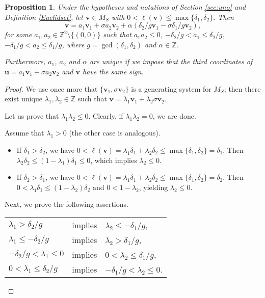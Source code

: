 \documentclass[11pt]{amsart}
\newtheorem{proposition}[theorem]{Proposition}
\theoremstyle{remark}
\begin{document}
\begin{proposition}\label{normalizacion} 
Under the hypotheses and notations of Section \ref{sec:uno} and Definition \ref{Euclidset}, let $\mathbf v\in M_S$ with $0< \ell(\mathbf v) \le \max\{\delta_1,\delta_2\}$. Then
\[
\mathbf v=a_1\mathbf v_1+\sigma a_2\mathbf v_2+\alpha(\delta_2/g\mathbf v_1-\sigma\delta_1/g\mathbf v_2),
\]
for some $a_1,a_2\in \mathbb Z^2\setminus\{(0,0)\}$ such that $a_1a_2\le 0$, $-\delta_2/g<a_1\le 
\delta_2/g$, $-\delta_1/g<a_2\le \delta_1/g$, where $g=\gcd(\delta_1,\delta_2)$ and $\alpha\in\mathbb Z$.

Furthermore, $a_1$, $a_2$ and $\alpha$ are unique if we impose that the third coordinates of $\mathbf u=a_1\mathbf v_1+\sigma a_2\mathbf v_2$ and $\mathbf v$ have the same sign.
\end{proposition}
\begin{proof} 
We use once more that $\{\mathbf v_1,\sigma\mathbf v_2\}$ is a generating system for $M_S$; then there exist unique $\lambda_1,\lambda_2\in \mathbb Z$ such that $\mathbf v=\lambda_1 \mathbf v_1 +\lambda_2\sigma\mathbf v_2$. 

Let us prove that $\lambda_1\lambda_2\le 0$. Clearly, if $\lambda_1\lambda_2=0$, we are done. 

Assume that $\lambda_1>0$ (the other case is analogous). 
\begin{itemize}
 \item If $\delta_1>\delta_2$, we have $0<\ell(\mathbf v)=\lambda_1\delta_1+\lambda_2\delta_2\le \max\{\delta_1,\delta_2\}=\delta_1$. Then $\lambda_2\delta_2\le (1-\lambda_1)\delta_1\le 0$, which implies  $\lambda_2\le 0$.
 \item If $\delta_2>\delta_1$, we have $0<\ell(\mathbf v)=\lambda_1\delta_1+\lambda_2\delta_2\le \max\{\delta_1,\delta_2\}=\delta_2$. Then $0<\lambda_1\delta_1\le (1-\lambda_2)\delta_2$ and $0<1-\lambda_2$, yielding $\lambda_2\le 0$.
\end{itemize} 

Next, we prove the following assertions. 

\begin{table}[h]
\begin{center}
\begin{tabular}{lcl}
$\lambda_1>\delta_2/g$ & implies & $\lambda_2\le -\delta_1/g$, \\
$\lambda_1\le -\delta_2/g$ & implies & $\lambda_2>\delta_1/g$, \\
$-\delta_2/g<\lambda_1\le 0$ & implies & $0<\lambda_2\le \delta_1/g$, \\
$0<\lambda_1\le \delta_2/g$ & implies & $-\delta_1/g<\lambda_2\le 0$. \\
\end{tabular}
\end{center}
\end{table}


\end{proof}
\end{document}
